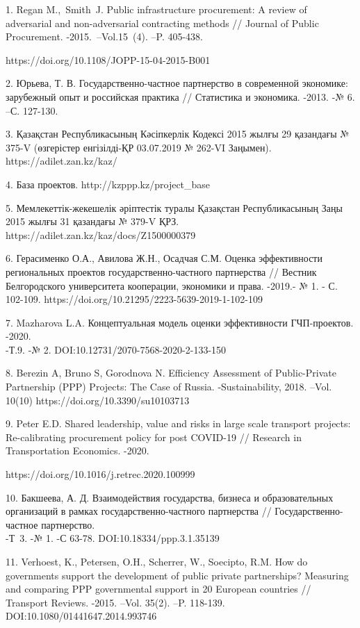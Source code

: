 \begin{noparindent}
1.
Regan M.,~Smith~J. Public infrastructure procurement: A review of
adversarial and non-adversarial contracting methods // Journal of
Public Procurement. -2015.~--Vol.15~(4). --P. 405-438.

https://doi.org/10.1108/JOPP-15-04-2015-B001

2.
Юрьева, Т. В. Государственно-частное партнерство в современной
экономике: зарубежный опыт и российская практика // Статистика и
экономика. -2013. -№ 6. --С. 127-130.

3.
Қазақстан Республикасының Кәсіпкерлік Кодексі 2015 жылғы 29 қазандағы
№ 375-V (өзгерістер енгізілді-ҚР 03.07.2019 № 262-VI Заңымен).
https://adilet.zan.kz/kaz/

4.
База проектов. http://kzppp.kz/project\_base

5.
Мемлекеттік-жекешелік әріптестік туралы Қазақстан Республикасының Заңы
2015 жылғы 31 қазандағы № 379-V ҚРЗ.
https://adilet.zan.kz/kaz/docs/Z1500000379

6.
Герасименко О.А., Авилова Ж.Н., Осадчая С.М. Оценка эффективности
региональных проектов государственно-частного партнерства // Вестник
Белгородского университета кооперации, экономики и права. -2019.- № 1.
- С. 102-109. https://doi.org/10.21295/2223-5639-2019-1-102-109

7.
Mazharova L.A. Концептуальная модель оценки эффективности
ГЧП-проектов. -2020.\\
-Т.9. -№ 2. DOI:10.12731/2070-7568-2020-2-133-150

8.
Berezin A, Bruno S, Gorodnova N. Efficiency Assessment of
Public-Private Partnership (PPP) Projects: The Case of Russia.
-Sustainability, 2018. --Vol. 10(10)
https://doi.org/10.3390/su10103713

9.
Peter E.D. Shared leadership, value and risks in large scale transport
projects: Re-calibrating procurement policy for post COVID-19 //
Research in Transportation Economics. -2020.

https://doi.org/10.1016/j.retrec.2020.100999

10.
Бакшеева, А. Д. Взаимодействия государства, бизнеса и образовательных
организаций в рамках государственно-частного партнерства //
Государственно-частное партнерство.\\
-Т~3. -№ 1. -С 63-78. DOI:10.18334/ppp.3.1.35139

11.
Verhoest, K., Petersen, O.H., Scherrer, W., Soecipto, R.M. How do
governments support the development of public private partnerships?
Measuring and comparing PPP governmental support in 20 European
countries // Transport Reviews. -2015. --Vol. 35(2). --P. 118-139.
DOI:10.1080/01441647.2014.993746


\end{noparindent}
